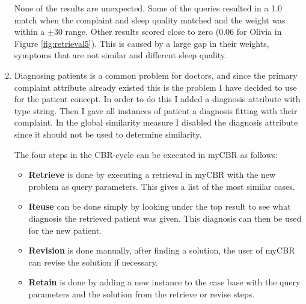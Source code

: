 \documentclass[a4paper]{article}
\begin{document}
\begin{enumerate}[label=\alph*)]
            None of the results are unexpected, Some of the queries resulted in
            a 1.0 match when the complaint and sleep quality matched and the
            weight was within a $±30$ range. Other results scored close to zero
            (0.06 for Olivia in Figure \ref{fig:retrieval5}). This is caused by
            a large gap in their weights, symptoms that are not similar and
            different sleep quality.
            
        \item
            Diagnosing patients is a common problem for doctors, and since the
            primary complaint attribute already existed this is the problem I
            have decided to use for the patient concept. In order to do this I
            added a diagnosis attribute with type string. Then I gave all
            instances of patient a diagnosis fitting with their complaint. In
            the global similarity measure I disabled the diagnosis attribute
            since it should not be used to determine similarity.

            The four steps in the CBR-cycle can be executed in myCBR as follows:

            \begin{itemize}
                \item
                    \textbf{Retrieve} is done by executing a retrieval in myCBR with
                    the new problem as query parameters. This gives a list of
                    the most similar cases.
                \item
                    \textbf{Reuse} can be done simply by looking under the top
                    result to see what diagnosis the retrieved patient was
                    given. This diagnosis can then be used for the new patient.
                \item
                    \textbf{Revision} is done manually, after finding a solution,
                    the user of myCBR can revise the solution if necessary.
                \item
                    \textbf{Retain} is done by adding a new instance to the case
                    base with the query parameters and the solution from the
                    retrieve or revise steps.
            \end{itemize}

    \end{enumerate}
\end{document}
